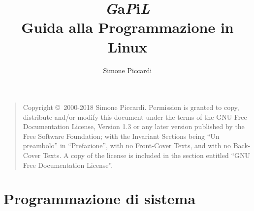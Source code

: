\documentclass[10pt,twoside]{book}
\title{\Huge \textbf{\textsl{G}a\textsl{P}i\textsl{L}}\\
\huge Guida alla Programmazione in Linux}
\author{Simone Piccardi}
\begin{document}
\frontmatter

\maketitle

\newcommand{\clearemptydoublepage}{\newpage{\pagestyle{empty}
\cleardoublepage}}

\begin{quote}
  
  Copyright \copyright\ 2000-2018 Simone Piccardi.  Permission is granted to
  copy, distribute and/or modify this document under the terms of the GNU Free
  Documentation License, Version 1.3 or any later version published by the
  Free Software Foundation; with the Invariant Sections being ``Un preambolo''
  in ``Prefazione'', with no Front-Cover Texts, and with no Back-Cover Texts.
  A copy of the license is included in the section entitled ``GNU Free
  Documentation License''.

\end{quote}
\clearemptydoublepage

\tableofcontents

\clearemptydoublepage



\clearemptydoublepage
\mainmatter

\lstset{language=C++} 



\setlength{\tabcolsep}{0.5em}

\def\incomplete{\relax}

\part{Programmazione di sistema}
\label{part:progr-di-sist}












\end{document}
